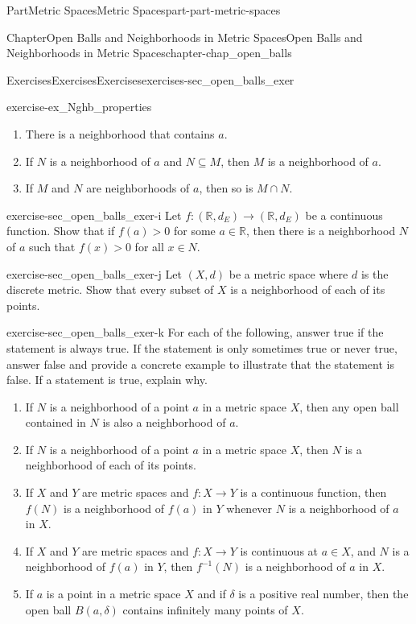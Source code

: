\documentclass[oneside,10pt,]{book}
\numberwithin{equation}{chapter}
\newcommand{\R}{\mathbb{R}}
\newcommand{\gt}{>}
\begin{document}
\begin{partptx}{Part}{Metric Spaces}{}{Metric Spaces}{}{}{part-part-metric-spaces}
\begin{chapterptx}{Chapter}{Open Balls and Neighborhoods in Metric Spaces}{}{Open Balls and Neighborhoods in Metric Spaces}{}{}{chapter-chap_open_balls}
\begin{exercises-section}{Exercises}{Exercises}{}{Exercises}{}{}{exercises-sec_open_balls_exer}
\begin{divisionexercise}{8}{}{}{exercise-ex_Nghb_properties}
\begin{enumerate}[font=\bfseries,label=(\alph*),ref=\alph*]%
\item{}There is a neighborhood that contains \(a\).%
\item{}If \(N\) is a neighborhood of \(a\) and \(N \subseteq M\), then \(M\) is a neighborhood of \(a\).%
\item{}If \(M\) and \(N\) are neighborhoods of \(a\), then so is \(M \cap N\).%
\end{enumerate}%
\end{divisionexercise}%
\begin{divisionexercise}{9}{}{}{exercise-sec_open_balls_exer-i}%
Let \(f: (\R,d_E) \to (\R,d_E)\) be a continuous function. Show that if \(f(a) \gt 0\) for some \(a \in \R\), then there is a neighborhood \(N\) of \(a\) such that \(f(x) \gt 0\) for all \(x \in N\).%
\end{divisionexercise}%
\begin{divisionexercise}{10}{}{}{exercise-sec_open_balls_exer-j}%
Let \((X,d)\) be a metric space where \(d\) is the discrete metric. Show that every subset of \(X\) is a neighborhood of each of its points.%
\end{divisionexercise}%
\begin{divisionexercise}{11}{}{}{exercise-sec_open_balls_exer-k}%
For each of the following, answer true if the statement is always true. If the statement is only sometimes true or never true, answer false and provide a concrete example to illustrate that the statement is false. If a statement is true, explain why.%
\begin{enumerate}[font=\bfseries,label=(\alph*),ref=\alph*]%
\item{}If \(N\) is a neighborhood of a point \(a\) in a metric space \(X\), then any open ball contained in \(N\) is also a neighborhood of \(a\).%
\item{}If \(N\) is a neighborhood of a point \(a\) in a metric space \(X\), then \(N\) is a neighborhood of each of its points.%
\item{}If \(X\) and \(Y\) are metric spaces and \(f : X \to Y\) is a continuous function, then \(f(N)\) is a neighborhood of \(f(a)\) in \(Y\) whenever \(N\) is a neighborhood of \(a\) in \(X\).%
\item{}If \(X\) and \(Y\) are metric spaces and \(f : X \to Y\) is continuous at \(a \in X\), and \(N\) is a neighborhood of \(f(a)\) in \(Y\), then \(f^{-1}(N)\) is a neighborhood of \(a\) in \(X\).%
\item{}If \(a\) is a point in a metric space \(X\) and if \(\delta\) is a positive real number, then the open ball \(B(a,\delta)\) contains infinitely many points of \(X\).%

\end{enumerate}
\end{divisionexercise}
\end{exercises-section}
\end{chapterptx}
\end{partptx}
\end{document}
